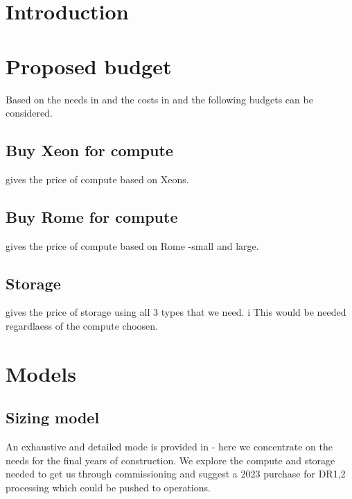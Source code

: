 \section{Introduction}



\section{Proposed budget}\label{sec:cost}
Based on the needs in  and the costs in  and 
the following budgets can be considered.

\subsection{Buy Xeon for compute} \label{sec:xeon}
 gives the price of compute based on Xeons.


\subsection{Buy Rome for compute} \label{sec:rome}
 gives the price of compute based on Rome -small and large.


\subsection{Storage} \label{sec:storagecost}
 gives the price of storage using all 3 types that we need. i
This would be needed regardlaess of the compute choosen.


\section{ Models}\label{sec:model}
\subsection{Sizing model}\label{sec:sizemodel}

An exhaustive and detailed mode is provided in   - here we concentrate on the needs for the
final years of construction. We explore the compute and storage needed to get us through commissioning and suggest a 2023 purchase for DR1,2 processing which could be pushed to operations.

